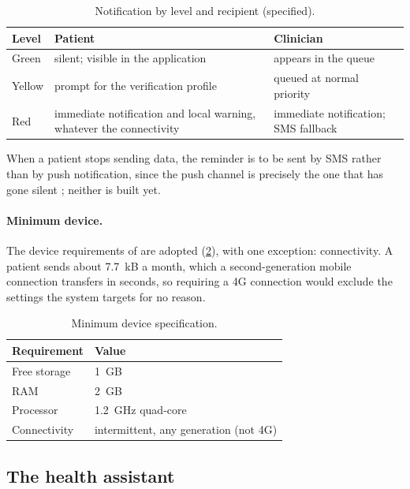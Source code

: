 \begin{table}[htbp]
\centering\small
\caption{Notification by level and recipient (specified).}\label{tab:notification}
\begin{tabularx}{\textwidth}{@{}>{\raggedright\arraybackslash}p{1.6cm} X >{\raggedright\arraybackslash}p{4.2cm}@{}}
\toprule
\textbf{Level} & \textbf{Patient} & \textbf{Clinician} \\
\midrule
Green & silent; visible in the application & appears in the queue \\
Yellow & prompt for the verification profile & queued at normal priority \\
Red & immediate notification and local warning, whatever the connectivity & immediate notification; SMS fallback \\
\bottomrule
\end{tabularx}
\end{table}

When a patient stops sending data, the reminder is to be sent by SMS rather than by push notification, since the push channel is precisely the one that has gone silent \parencite{yazdani2018}; neither is built yet.

\paragraph{Minimum device.} The device requirements of \textcite{efendi2025} are adopted (\cref{tab:device-spec}), with one exception: connectivity. A patient sends about 7.7~kB a month, which a second-generation mobile connection transfers in seconds, so requiring a 4G connection would exclude the settings the system targets for no reason.

\begin{table}[htbp]
\centering\small
\caption{Minimum device specification.}\label{tab:device-spec}
\begin{tabularx}{\textwidth}{@{}>{\raggedright\arraybackslash}p{4.0cm} X@{}}
\toprule
\textbf{Requirement} & \textbf{Value} \\
\midrule
Free storage & 1~GB \\
RAM & 2~GB \\
Processor & 1.2~GHz quad-core \\
Connectivity & intermittent, any generation (not 4G) \\
\bottomrule
\end{tabularx}
\end{table}

\subsection{The health assistant}\label{sec:assistant}

